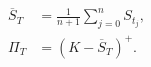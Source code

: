 \documentclass{equation-sheet}
\begin{document}
\begin{equation*}
\begin{aligned}
\overline{S}_T
  &= \frac{1}{n+1}\sum_{j=0}^{n} S_{t_j}, \\[0.55em]
\Pi_T &= (K-\overline{S}_T)^{+}.
\end{aligned}
\end{equation*}
\end{document}
